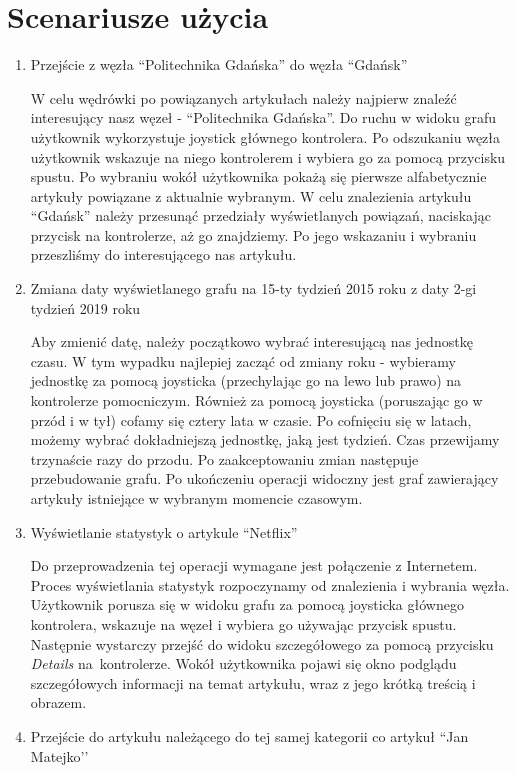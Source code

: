 \section{Scenariusze użycia}
\begin{enumerate}
\item Przejście z węzła ``Politechnika Gdańska'' do węzła ``Gdańsk''

	W celu wędrówki po powiązanych artykułach należy najpierw znaleźć interesujący nasz węzeł - ``Politechnika Gdańska''. Do ruchu w widoku grafu użytkownik wykorzystuje joystick głównego kontrolera. Po odszukaniu węzła użytkownik wskazuje na niego kontrolerem i wybiera go za pomocą przycisku spustu. Po wybraniu wokół użytkownika pokażą się pierwsze alfabetycznie artykuły powiązane z aktualnie wybranym. W celu znalezienia artykułu ``Gdańsk'' należy przesunąć przedziały wyświetlanych powiązań, naciskając przycisk na kontrolerze, aż go znajdziemy. Po jego wskazaniu i wybraniu przeszliśmy do interesującego nas artykułu.
	
\item Zmiana daty wyświetlanego grafu na 15-ty tydzień  2015 roku z daty 2-gi tydzień 2019 roku

    Aby zmienić datę, należy początkowo wybrać interesującą nas jednostkę czasu. W tym wypadku najlepiej zacząć od zmiany roku - wybieramy jednostkę za pomocą joysticka (przechylając go na lewo lub prawo) na kontrolerze pomocniczym. Również za pomocą joysticka (poruszając go w przód i w tył) cofamy się cztery lata w czasie. Po cofnięciu się w latach, możemy wybrać dokładniejszą jednostkę, jaką jest tydzień. Czas przewijamy trzynaście razy do przodu. Po zaakceptowaniu zmian następuje przebudowanie grafu. Po ukończeniu operacji widoczny jest graf zawierający artykuły istniejące w wybranym momencie czasowym.
	
\item Wyświetlanie statystyk o artykule ``Netflix''

	Do przeprowadzenia tej operacji wymagane jest połączenie z Internetem. Proces wyświetlania statystyk rozpoczynamy od znalezienia i wybrania węzła. Użytkownik porusza się w widoku grafu za pomocą joysticka głównego kontrolera, wskazuje na węzeł i wybiera go używając przycisk spustu. Następnie wystarczy przejść do widoku szczegółowego za pomocą przycisku \textit{Details} na~kontrolerze. Wokół użytkownika pojawi się okno podglądu szczegółowych informacji na temat artykułu, wraz z jego krótką treścią i obrazem.
	
\item Przejście do artykułu należącego do tej samej kategorii co artykuł ``Jan Matejko’’


\end{enumerate}
